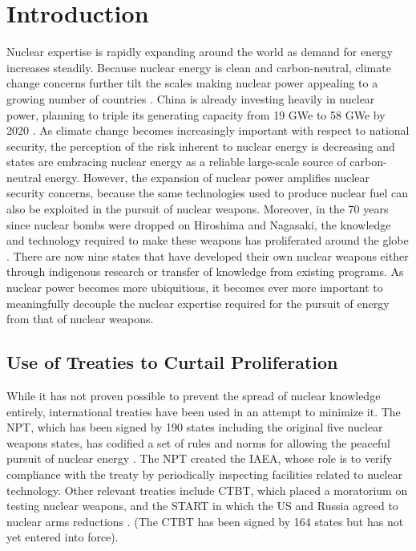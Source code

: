 \section{Introduction}
\label{s_motive}


Nuclear expertise is rapidly expanding around the world as demand for energy increases steadily. Because nuclear energy is clean and carbon-neutral, climate change concerns further tilt the scales making nuclear power appealing to a growing number of countries \cite{mooney_why_2014}.  China is already investing heavily in nuclear power, planning to triple its generating capacity from 19 \gls{GWe} to 58 \gls{GWe} by 2020 \cite{_china_2014}.  As climate change becomes increasingly important with respect to national security, the perception of the risk inherent to nuclear energy is decreasing and states are embracing nuclear energy as a reliable large-scale source of carbon-neutral energy.  However, the expansion of nuclear power amplifies nuclear security concerns, because the same technologies used to produce nuclear fuel can also be exploited in the pursuit of nuclear weapons.  Moreover, in the 70 years since nuclear bombs were dropped on Hiroshima and Nagasaki, the knowledge and technology required to make these weapons has proliferated around the globe \cite{feiveson_unmaking_2014}. There are now nine states that have developed their own nuclear weapons either through indigenous research or transfer of knowledge from existing programs. As nuclear power becomes more ubiquitious, it becomes ever more important to meaningfully decouple the nuclear expertise required for the pursuit of energy from that of nuclear weapons.  


\subsection{Use of Treaties to Curtail Proliferation}

While it has not proven possible to prevent the spread of nuclear knowledge entirely, international treaties have been used in an attempt to minimize it.  The \gls{NPT}, which has been signed by 190 states including the original five nuclear weapons states, has codified a set of rules and norms for allowing the peaceful pursuit of nuclear energy \cite{_treaty_????}.  The \gls{NPT} created the \gls{IAEA}, whose role is to verify compliance with the treaty by periodically inspecting facilities related to nuclear technology.  Other relevant treaties include \gls{CTBT}, which placed a moratorium on testing nuclear weapons, and the \gls{START} in which the \gls{US} and Russia agreed to nuclear arms reductions \cite{_treaty:_????, department_of_State_new_2010}. (The \gls{CTBT} has been signed by 164 states but has not yet entered into force).

